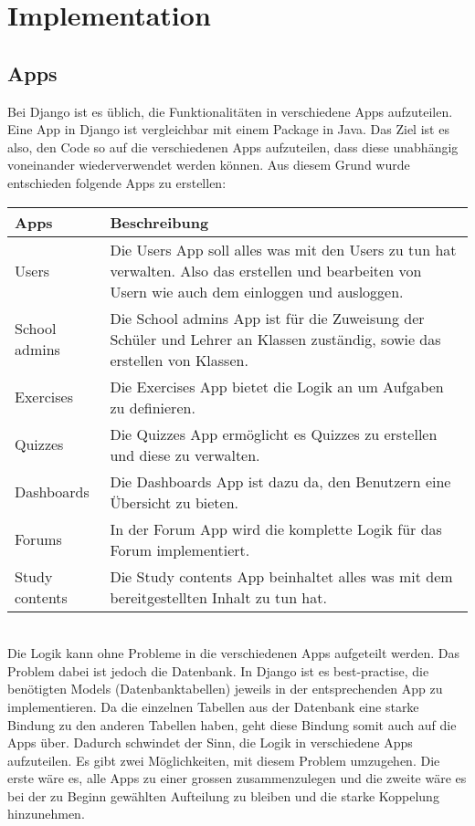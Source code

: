 \section{Implementation}

\subsection{Apps}
Bei Django ist es üblich, die Funktionalitäten in verschiedene Apps aufzuteilen. Eine App in Django ist vergleichbar mit einem Package in Java. Das Ziel ist es also, den Code so auf die verschiedenen Apps aufzuteilen, dass diese unabhängig voneinander wiederverwendet werden können. Aus diesem Grund wurde entschieden folgende Apps zu erstellen: \\
\newline
\begin{tabularx}{\textwidth}{| X | X |}
	\hline
		\textbf{Apps} & \textbf{Beschreibung} \\
	\hline
		Users & Die Users App soll alles was mit den Users zu tun hat verwalten. Also das erstellen und bearbeiten von Usern wie auch dem einloggen und ausloggen. \\
	\hline
		School admins & Die School admins App ist für die Zuweisung der Schüler und Lehrer an Klassen zuständig, sowie das erstellen von Klassen. \\
	\hline
		Exercises & Die Exercises App bietet die Logik an um Aufgaben zu definieren. \\
	\hline 
		Quizzes & Die Quizzes App ermöglicht es Quizzes zu erstellen und diese zu verwalten. \\
	\hline
		Dashboards & Die Dashboards App ist dazu da, den Benutzern eine Übersicht zu bieten. \\
	\hline
		Forums & In der Forum App wird die komplette Logik für das Forum implementiert. \\
	\hline
		Study contents & Die Study contents App beinhaltet alles was mit dem bereitgestellten Inhalt zu tun hat. \\
	\hline
\end{tabularx} \\


\noindent Die Logik kann ohne Probleme in die verschiedenen Apps aufgeteilt werden. Das Problem dabei ist jedoch die Datenbank. In Django ist es best-practise, die benötigten Models (Datenbanktabellen) jeweils in der entsprechenden App zu implementieren. Da die einzelnen Tabellen aus der Datenbank eine starke Bindung zu den anderen Tabellen haben, geht diese Bindung somit auch auf die Apps über. Dadurch schwindet der Sinn, die Logik in verschiedene Apps aufzuteilen. Es gibt zwei Möglichkeiten, mit diesem Problem umzugehen. Die erste wäre es, alle Apps zu einer grossen zusammenzulegen und die zweite wäre es bei der zu Beginn gewählten Aufteilung zu bleiben und die starke Koppelung hinzunehmen. 

